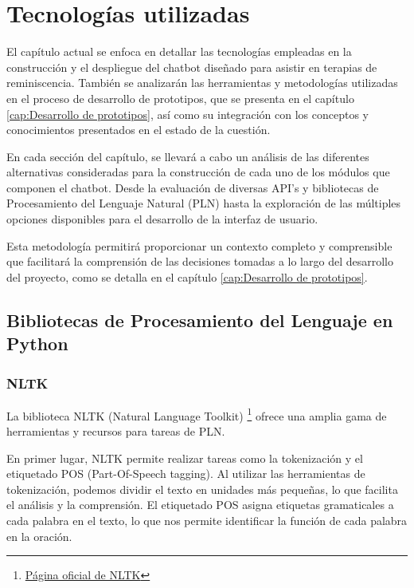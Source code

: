 \chapter{Tecnologías utilizadas}
\label{cap:TecnologiasUtilizadas}

El capítulo actual se enfoca en detallar las tecnologías empleadas en la construcción y el despliegue del chatbot diseñado para asistir en terapias de reminiscencia. También se analizarán las herramientas y metodologías utilizadas en el proceso de desarrollo de prototipos, que se presenta en el capítulo \ref{cap:Desarrollo de prototipos}, así como su integración con los conceptos y conocimientos presentados en el estado de la cuestión.

En cada sección del capítulo, se llevará a cabo un análisis de las diferentes alternativas consideradas para la construcción de cada uno de los módulos que componen el chatbot. Desde la evaluación de diversas API's y bibliotecas de Procesamiento del Lenguaje Natural (PLN) hasta la exploración de las múltiples opciones disponibles para el desarrollo de la interfaz de usuario.

Esta metodología permitirá proporcionar un contexto completo y comprensible que facilitará la comprensión de las decisiones tomadas a lo largo del desarrollo del proyecto, como se detalla en el capítulo \ref{cap:Desarrollo de prototipos}. 

\section{Bibliotecas de Procesamiento del Lenguaje en Python}

\subsection{NLTK}
La biblioteca NLTK (Natural Language Toolkit) \footnote{\href{https://www.nltk.org/}{Página oficial de NLTK}} ofrece una amplia gama de herramientas y recursos para tareas de PLN.

En primer lugar, NLTK permite realizar tareas como la tokenización y el  etiquetado POS (Part-Of-Speech tagging). Al utilizar las herramientas de tokenización, podemos dividir el texto en unidades más pequeñas, lo que facilita el análisis y la comprensión. El etiquetado POS asigna etiquetas gramaticales a cada palabra en el texto, lo que nos permite identificar la función de cada palabra en la oración. \\

